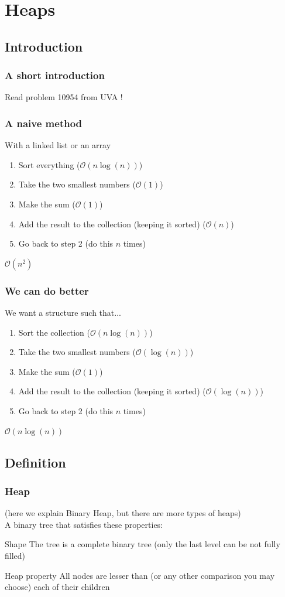 \documentclass[10pt,svgnames,usenames,table]{beamer} %
\newcommand{\bigoh}{\mathcal{O}}
\begin{document}
\section{Heaps}
\subsection{Introduction}
\begin{frame}
  \frametitle{A short introduction}
  Read problem 10954 from UVA !
\end{frame}

\begin{frame}
  \frametitle{A naive method}
  With a linked list or an array
  \begin{enumerate}
    \item Sort everything ($\bigoh(n\log(n))$)
    \item Take the two smallest numbers ($\bigoh(1)$)
    \item Make the sum ($\bigoh(1)$)
    \item Add the result to the collection (keeping it sorted) ($\bigoh(n)$)
    \item Go back to step 2 (do this $n$ times)
  \end{enumerate}
  \begin{center}
  {\Large $\bigoh(n^2)$}
  \end{center}
\end{frame}

\begin{frame}
  \frametitle{We can do better}
  We want a structure such that...
  \begin{enumerate}
    \item Sort the collection ($\bigoh(n\log(n))$)
    \item Take the two smallest numbers ($\bigoh(\log(n))$)
    \item Make the sum ($\bigoh(1)$)
    \item Add the result to the collection (keeping it sorted) ($\bigoh(\log(n))$)
    \item Go back to step 2 (do this $n$ times)
  \end{enumerate}
  \begin{center}
  {\Large $\bigoh(n\log(n))$}
  \end{center}
\end{frame}

\subsection{Definition}
\begin{frame}
  \frametitle{Heap}
  (here we explain Binary Heap, but there are more types of heaps)\\
  A binary tree that satisfies these properties:
  \begin{block}{Shape}
    The tree is a complete binary tree (only the last level can be not fully filled)
  \end{block}
  \begin{block}{Heap property}
    All nodes are lesser than (or any other comparison you may choose) each of their children
  \end{block}
\end{frame}
\end{document}

